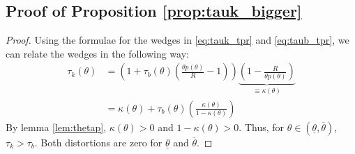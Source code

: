 \documentclass[11pt]{article}
\begin{document}
\subsection*{Proof of Proposition \ref{prop:tauk_bigger}}
\begin{proof}
    Using the formulae for the wedges in \eqref{eq:tauk_tpr} and \eqref{eq:taub_tpr}, we can relate the wedges in the following way: 
    \begin{align*}
        \tau_{k}\left(\theta\right)&=\left(1+\tau_{b}\left(\theta\right)\left(\frac{\theta p\left(\theta\right)}{R}-1\right)\right)\underbrace{\left(1-\frac{R}{\theta p\left(\theta\right)}\right)}_{\equiv\kappa\left(\theta\right)}\\&=\kappa\left(\theta\right)+\tau_{b}\left(\theta\right)\left(\frac{\kappa\left(\theta\right)}{1-\kappa\left(\theta\right)}\right)
    \end{align*}
    By lemma \ref{lem:thetap}, \( \kappa(\theta)>0 \) and \( 1-\kappa(\theta)>0 \). Thus, for \( \theta\in\left(\underline{\theta},\overline{\theta}\right) \), \( \tau_{k}>\tau_{b} \). Both distortions are zero for \( \underline{\theta} \) and \( \overline{\theta} \). 
\end{proof}
\end{document}
